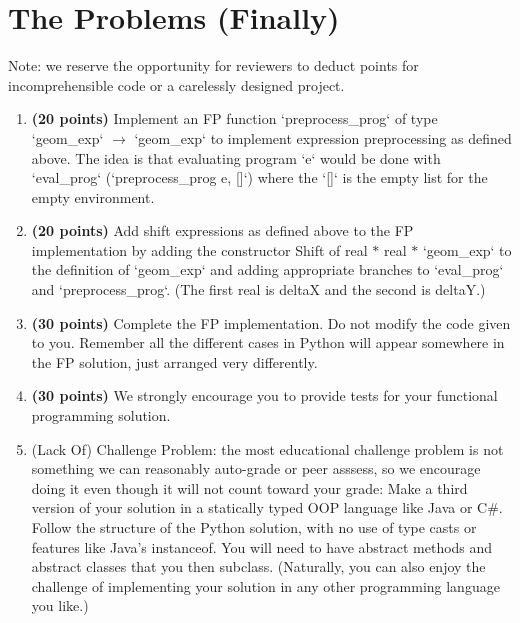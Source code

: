 \documentclass[a4paper,12pt]{article}
\begin{document}
\section{The Problems (Finally)}
Note: we reserve the opportunity for reviewers to deduct points
for incomprehensible code or a carelessly designed project.
\begin{enumerate}
  \item \textbf{(20 points)} Implement an FP function `preprocess\_prog` of type `geom\_exp` $\rightarrow$ `geom\_exp` to implement expression preprocessing as defined above. The idea is that evaluating program `e` would be done with `eval\_prog` (`preprocess\_prog e, []`) where the `[]` is the empty list for the empty environment.

  \item \textbf{(20 points)} Add shift expressions as defined above to the FP implementation by adding the constructor Shift of real $*$ real $*$ `geom\_exp` to the definition of `geom\_exp` and adding appropriate branches to `eval\_prog` and `preprocess\_prog`. (The first real is deltaX and the second is deltaY.)

  \item \textbf{(30 points)} Complete the FP implementation. Do not modify the code given to you. Remember all the different cases in Python will appear somewhere in the FP solution, just arranged very differently.

  \item \textbf{(30 points)} We strongly encourage you to provide tests for your functional programming solution.

  \item (Lack Of) Challenge Problem: the most educational challenge problem is not something we can reasonably auto-grade or peer asssess, so we encourage doing it even though it will not count toward your grade: Make a third version of your solution in a statically typed OOP language like Java or C\#. Follow the structure of the Python solution, with no use of type casts or features like Java's instanceof. You will need to have abstract methods and abstract classes that you then subclass. (Naturally, you can also enjoy the challenge of implementing your solution in any other programming language you like.)
\end{enumerate}
\end{document}
